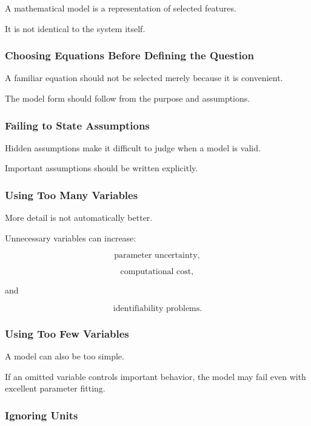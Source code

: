 A mathematical model is a representation of selected features.

It is not identical to the system itself.

\subsubsection{Choosing Equations Before Defining the Question}

A familiar equation should not be selected merely because it is convenient.

The model form should follow from the purpose and assumptions.

\subsubsection{Failing to State Assumptions}

Hidden assumptions make it difficult to judge when a model is valid.

Important assumptions should be written explicitly.

\subsubsection{Using Too Many Variables}

More detail is not automatically better.

Unnecessary variables can increase:

\[
\boxed{
\text{parameter uncertainty},
}
\]

\[
\boxed{
\text{computational cost},
}
\]

and

\[
\boxed{
\text{identifiability problems}.
}
\]

\subsubsection{Using Too Few Variables}

A model can also be too simple.

If an omitted variable controls important behavior, the model may fail even
with excellent parameter fitting.

\subsubsection{Ignoring Units}

